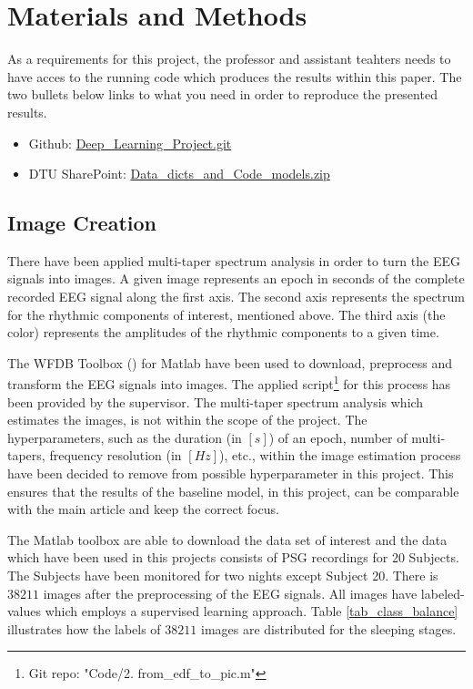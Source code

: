 \section{Materials and Methods}
\label{sec:materials_and_methods}

 As a requirements for this project, the professor and assistant teahters needs to have acces to the running code which produces the results within this paper. The two bullets below links to what you need in order to reproduce the presented results.
 \begin{itemize}
 	\item Github: \href{https://github.com/anderslaunerbaek/Deep\_Learning\_Project.git}{Deep\_Learning\_Project.git}
 	\item DTU SharePoint: \href{https://dtudk-my.sharepoint.com/personal/s160159\_win\_dtu\_dk/\_layouts/15/guestaccess.aspx?docid=093aa4dcaee0b4e3aa18b0ee67061a678&authkey=AbdnyuYwQUWn0BDEPeDn1Mg&e=b79a063cd72d43a9b7db88f8b8fd1b06}{Data\_dicts\_and\_Code\_models.zip}
 \end{itemize}

\subsection{Image Creation}
There have been applied multi-taper spectrum analysis in order to turn the EEG signals into images. A given image represents an epoch in seconds of the complete recorded EEG signal along the first axis. The second axis represents the spectrum for the rhythmic components of interest, mentioned above. The third axis (the color) represents the amplitudes of the rhythmic components to a given time. 

The WFDB Toolbox (\cite{matlab}) for Matlab have been used to download, preprocess and transform the EEG signals into images. The applied script\footnote{Git repo: "Code/2. from\_edf\_to\_pic.m"} for this process has been provided by the supervisor. 
The multi-taper spectrum analysis which estimates the images, is not within the scope of the project. The hyperparameters, such as the duration (in $\left[s \right]$) of an epoch, number of multi-tapers, frequency resolution (in $\left[Hz \right]$), etc., within the image estimation process have been decided to remove from possible hyperparameter in this project. This ensures that the results of the baseline model, in this project, can be comparable with the main article \cite{main_ar} and keep the correct focus. 

The Matlab toolbox are able to download the data set of interest and the data which have been used in this projects consists of PSG recordings for 20 Subjects. The Subjects have been monitored for two nights except Subject 20. There is $38211$ images after the preprocessing of the EEG signals. All images have labeled-values which employs a supervised learning approach. Table \ref{tab_class_balance} illustrates how the labels of $38211$ images are distributed for the sleeping stages.

